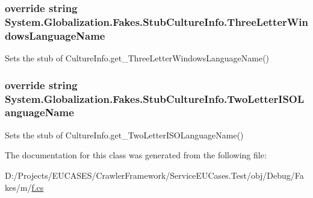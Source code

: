 \hypertarget{class_system_1_1_globalization_1_1_fakes_1_1_stub_culture_info_a3b647a11fd14f0127bd9d9ddbc4a8651}{
\subsubsection[{Three\-Letter\-Windows\-Language\-Name}]{\setlength{\rightskip}{0pt plus 5cm}override string System.\-Globalization.\-Fakes.\-Stub\-Culture\-Info.\-Three\-Letter\-Windows\-Language\-Name\hspace{0.3cm}{\ttfamily [get]}}}\label{class_system_1_1_globalization_1_1_fakes_1_1_stub_culture_info_a3b647a11fd14f0127bd9d9ddbc4a8651}


Sets the stub of Culture\-Info.\-get\-\_\-\-Three\-Letter\-Windows\-Language\-Name()

\hypertarget{class_system_1_1_globalization_1_1_fakes_1_1_stub_culture_info_a0f5ec21959a403304304a220d442176b}{
\subsubsection[{Two\-Letter\-I\-S\-O\-Language\-Name}]{\setlength{\rightskip}{0pt plus 5cm}override string System.\-Globalization.\-Fakes.\-Stub\-Culture\-Info.\-Two\-Letter\-I\-S\-O\-Language\-Name\hspace{0.3cm}{\ttfamily [get]}}}\label{class_system_1_1_globalization_1_1_fakes_1_1_stub_culture_info_a0f5ec21959a403304304a220d442176b}


Sets the stub of Culture\-Info.\-get\-\_\-\-Two\-Letter\-I\-S\-O\-Language\-Name()



The documentation for this class was generated from the following file\-:\begin{DoxyCompactItemize}
\item 
D\-:/\-Projects/\-E\-U\-C\-A\-S\-E\-S/\-Crawler\-Framework/\-Service\-E\-U\-Cases.\-Test/obj/\-Debug/\-Fakes/m/\hyperlink{m_2f_8cs}{f.\-cs}\end{DoxyCompactItemize}
